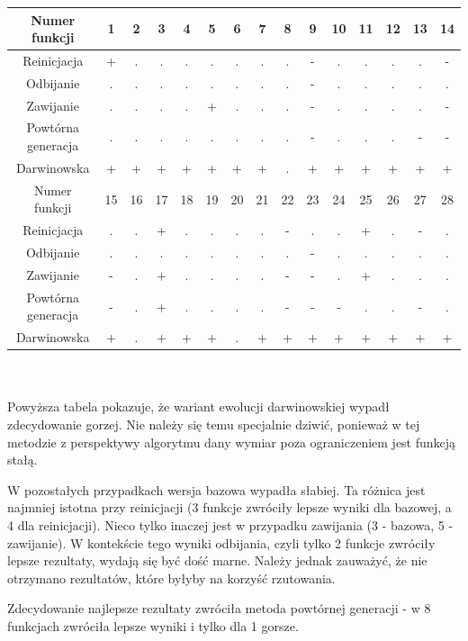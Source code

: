 \documentclass{mini}
\begin{document}
\begin{tabular}{|c|c|c|c|c|c|c|c|c|c|c|c|c|c|c|} \hline
Numer funkcji & 1 & 2 & 3 & 4 & 5 & 6 & 7 & 8 & 9 & 10 & 11 & 12 & 13 & 14 \\ \hline
Reinicjacja & + & . & . & . & . & . & . & . & - & . & . & . & . & - \\ \hline
Odbijanie & . & . & . & . & . & . & . & . & - & . & . & . & . & . \\ \hline
Zawijanie & . & . & . & . & + & . & . & . & - & . & . & . & . & - \\ \hline
Powtórna generacja & . & . & . & . & . & . & . & . & - & . & . & . & - & - \\ \hline
Darwinowska & + & + & + & + & + & + & + & . & + & + & + & + & + & + \\ \hline \hline
Numer funkcji & 15 & 16 & 17 & 18 & 19 & 20 & 21 & 22 & 23 & 24 & 25 & 26 & 27 & 28 \\ \hline
Reinicjacja & . & . & + & . & . & . & . & - & . & . & + & . & - & . \\ \hline
Odbijanie & . & . & . & . & . & . & . & . & - & . & . & . & . & . \\ \hline
Zawijanie & - & . & + & . & . & . & . & - & - & . & + & . & . & . \\ \hline
Powtórna generacja & - & . & + & . & . & . & . & - & - & - & . & . & - & . \\ \hline
Darwinowska & + & . & + & + & + & . & + & + & + & + & + & + & + & + \\ \hline
\end{tabular} \\ \\

Powyższa tabela pokazuje, że wariant ewolucji darwinowskiej wypadł zdecydowanie gorzej. Nie należy się temu specjalnie dziwić, ponieważ w tej metodzie z perspektywy algorytmu dany wymiar poza ograniczeniem jest funkcją stałą.

W pozostałych przypadkach wersja bazowa wypadła słabiej. Ta różnica jest najmniej istotna przy reinicjacji (3 funkcje zwróciły lepsze wyniki dla bazowej, a 4 dla reinicjacji). Nieco tylko inaczej jest w przypadku zawijania (3 - bazowa, 5 - zawijanie). W kontekście tego wyniki odbijania, czyli tylko 2 funkcje zwróciły lepsze rezultaty, wydają się być dość marne. Należy jednak zauważyć, że nie otrzymano rezultatów, które byłyby na korzyść rzutowania.

Zdecydowanie najlepsze rezultaty zwróciła metoda powtórnej generacji - w 8 funkcjach zwróciła lepsze wyniki i tylko dla 1 gorsze.
\end{document}
